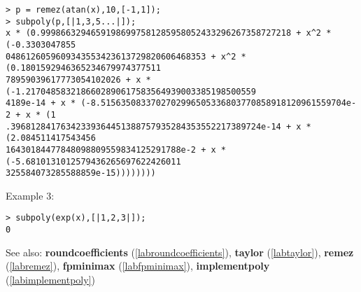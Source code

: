 \begin{center}\begin{minipage}{15cm}\begin{Verbatim}[frame=single]
> p = remez(atan(x),10,[-1,1]);
> subpoly(p,[|1,3,5...|]);
x * (0.99986632946591986997581285958052433296267358727218 + x^2 * (-0.3303047855
0486126059609343553423613729820606468353 + x^2 * (0.1801592946365234679974377511
78959039617773054102026 + x * (-1.2170485832186602890617583564939003385198500559
4189e-14 + x * (-8.5156350833702702996505336803770858918120961559704e-2 + x * (1
.39681284176342339364451388757935284353552217389724e-14 + x * (2.084511417543456
16430184477848098809559834125291788e-2 + x * (-5.6810131012579436265697622426011
325584073285588859e-15))))))))
\end{Verbatim}
\end{minipage}\end{center}
\noindent Example 3: 
\begin{center}\begin{minipage}{15cm}\begin{Verbatim}[frame=single]
> subpoly(exp(x),[|1,2,3|]);
0
\end{Verbatim}
\end{minipage}\end{center}
See also: \textbf{roundcoefficients} (\ref{labroundcoefficients}), \textbf{taylor} (\ref{labtaylor}), \textbf{remez} (\ref{labremez}), \textbf{fpminimax} (\ref{labfpminimax}), \textbf{implementpoly} (\ref{labimplementpoly})
